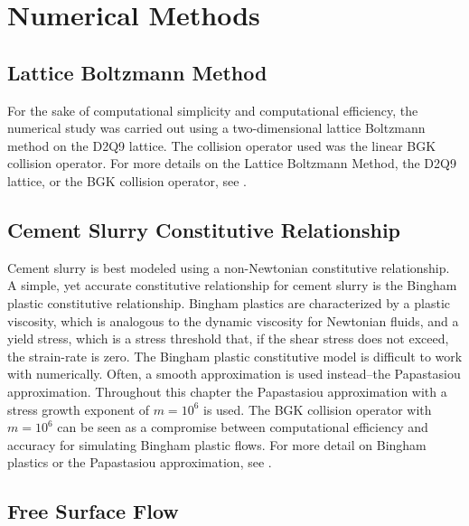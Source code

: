\documentclass[pdftex,ms]{pittetd}
\begin{document}
\section{Numerical Methods} \label{sec:numerical-methods}

\subsection{Lattice Boltzmann Method}


For the sake of computational simplicity and computational efficiency, the numerical study was carried out using a two-dimensional lattice Boltzmann method on the D2Q9 lattice.
The collision operator used was the linear BGK collision operator.
For more details on the Lattice Boltzmann Method, the D2Q9 lattice, or the BGK collision operator, see .

\subsection{Cement Slurry Constitutive Relationship}

Cement slurry is best modeled using a non-Newtonian constitutive relationship.
A simple, yet accurate constitutive relationship for cement slurry is the Bingham plastic constitutive relationship.
Bingham plastics are characterized by a plastic viscosity, which is analogous to the dynamic viscosity for Newtonian fluids, and a yield stress, which is a stress threshold that, if the shear stress does not exceed, the strain-rate is zero.
The Bingham plastic constitutive model is difficult to work with numerically.
Often, a smooth approximation is used instead--the Papastasiou approximation.
Throughout this chapter the Papastasiou approximation with a stress growth exponent of $m = 10^6$ is used.
The BGK collision operator with $m = 10^6$ can be seen as a compromise between computational efficiency and accuracy for simulating Bingham plastic flows.
For more detail on Bingham plastics or the Papastasiou approximation, see .

\subsection{Free Surface Flow}
\end{document}
